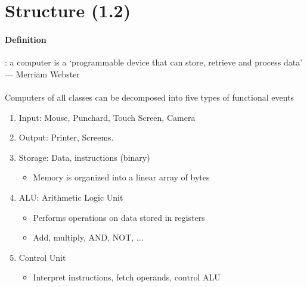   \section{Structure (1.2)}
    \paragraph{Definition}: a computer is a `programmable device that can
    store, retrieve and process data' \\ --- Merriam Webster
    \\
    \\
    Computers of all classes can be decomposed into five types of functional
    events
    \begin{enumerate}
      \item Input: Mouse, Punchard, Touch Screen, Camera
      \item Output: Printer, Screems.
      \item Storage: Data, instructions (binary)
      \begin{itemize}
        \item Memory is organized into a linear array of bytes
      \end{itemize}
      \item ALU: Arithmetic Logic Unit
      \begin{itemize}
        \item Performs operations on data stored in registers
        \item Add, multiply, AND, NOT, ...
      \end{itemize}
      \item Control Unit
      \begin{itemize}
        \item Interpret instructions, fetch operands, control ALU
      \end{itemize}
    \end{enumerate}
